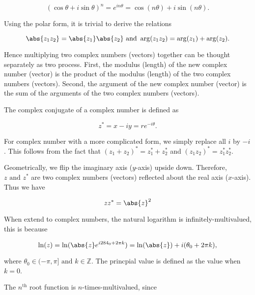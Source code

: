 \documentclass[english,a4paper,12pt]{report}
\begin{document}
\begin{equation}
	(\cos \theta + i \sin \theta )^{n} = e^{i n \theta } = \cos (n \theta ) + i \sin (n \theta ).
\end{equation}

Using the polar form, it is trivial to derive the relations

\begin{equation}
	\abs{z_1 z_2 } = \abs{z_1 }\abs{z_2 } \text { and } \arg (z_1 z_2 ) = \arg (z_1 ) + \arg (z_2 ).
\end{equation}

Hence multiplying two complex numbers (vectors) together can be thought separately as two process. First, the modulus (length) of the new complex number (vector) is the product of the modulus (length) of the two complex numbers (vectors). Second, the argument of the new complex number (vector) is the sum of the arguments of the two complex numbers (vectors).

The complex conjugate of a complex number is defined as 

\begin{equation}
	z^* = x-iy = re^{-i \theta }.
\end{equation}

For complex number with a more complicated form, we simply replace all \(i\) by \(-i\). This follows from the fact that \((z_1 + z_2 )^* = z_1 ^* + z_2 ^*\) and \((z_1 z_2 )^* = z_1 ^* z_2 ^*\).  

Geometrically, we flip the imaginary axis (\(y\)-axis) upside down. Therefore, \(z \text { and } z^*\) are two complex numbers (vectors) reflected about the real axis (\(x\)-axis). Thus we have

\begin{equation}
	z z^* = \abs{z}^2 
\end{equation}

When extend to complex numbers, the natural logarithm is infinitely-multivalued, this is because 

\begin{equation}
    \ln (z) = \ln (\abs{z}e^{i \the\tau _{0}  + 2\pi k}  ) = \ln (\abs{z} ) + i (\theta _{0} +2\pi k),
\end{equation}

where \(\theta _{0} \in (-\pi ,\pi ] \text { and } k \in \mathbb{Z}\). The princpial value is defined as the value when \(k = 0\).  

The \(n^{\text{th}} \) root function is \(n\)-times-multivalued, since 
\end{document}
